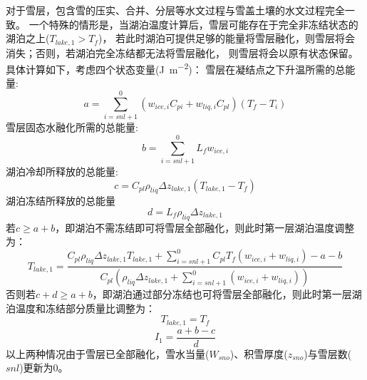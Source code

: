 对于雪层，包含雪的压实、合并、分层等水文过程与雪盖土壤的水文过程完全一致。
一个特殊的情形是，当湖泊温度计算后，雪层可能存在于完全非冻结状态的湖泊之上($T_{lake,1}>T_f$)，
若此时湖泊可提供足够的能量将雪层融化，则雪层将会消失；否则，若湖泊完全冻结都无法将雪层融化，
则雪层将会以原有状态保留。具体计算如下，考虑四个状态变量(\unit{J.m^{-2}})：
雪层在凝结点之下升温所需的总能量:
\begin{equation}
a=\sum_{i=s n l+1}^{0}\left(w_{ice, i} C_{p i}+w_{liq, i} C_{p l}\right)\left(T_{f}-T_{i}\right)
\end{equation}
雪层固态水融化所需的总能量:
\begin{equation}
b=\sum_{i=s n l+1}^{0} L_{f} w_{ice, i}
\end{equation}
湖泊冷却所释放的总能量:
\begin{equation}
c=C_{p l} \rho_{liq} \Delta z_{lake, 1}\left(T_{lake, 1}-T_{f}\right)
\end{equation}
湖泊冻结所释放的总能量
\begin{equation}
    d=L_{f} \rho_{liq} \Delta z_{lake, 1}
\end{equation}
若$c\geq a+b$，即湖泊不需冻结即可将雪层全部融化，则此时第一层湖泊温度调整为：
\begin{equation}
T_{lake, 1}=\frac{C_{p l} \rho_{liq} \Delta z_{lake, 1} T_{lake, 1}+\sum_{i=s n l+1}^{0} C_{p l}
 T_{f}\left(w_{ice, i}+w_{liq, i}\right)-a-b}{C_{p l}\left(\rho_{liq} \Delta z_{lake, 1}+\sum_{i=s n l+1}^{0}
 \left(w_{ice, i}+w_{liq, i}\right)\right)}
\end{equation}
否则若$c+d\geq a+b$，即湖泊通过部分冻结也可将雪层全部融化，则此时第一层湖泊温度和冻结部分质量比调整为：
\begin{equation}
T_{lake, 1}=T_{f}
\end{equation}
\begin{equation}
I_{1}=\frac{a+b-c}{d}
\end{equation}
以上两种情况由于雪层已全部融化，雪水当量($W_{sno}$)、积雪厚度($z_{sno}$)与雪层数($snl$)更新为0。